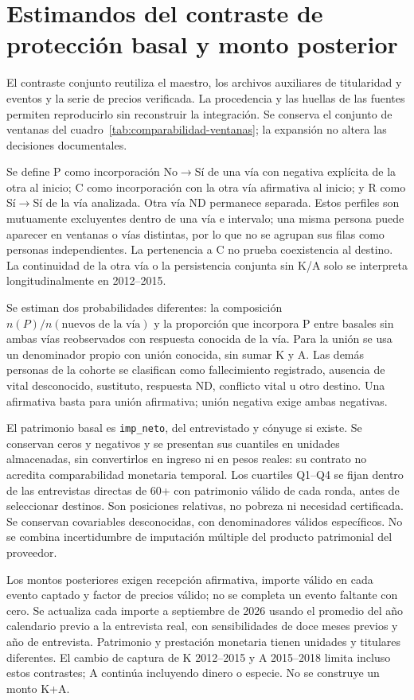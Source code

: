 \section{Estimandos del contraste de protección basal y monto posterior}
\label{sec:metodo-central09}
El contraste conjunto reutiliza el maestro, los archivos auxiliares de
titularidad y eventos y la serie de precios verificada. La procedencia y las
huellas de las fuentes permiten reproducirlo sin reconstruir la integración. Se conserva el conjunto de ventanas del cuadro~\ref{tab:comparabilidad-ventanas}; la expansión no altera las decisiones documentales.

Se define P como incorporación No$\to$Sí de una vía con negativa explícita de la otra al inicio; C como incorporación con la otra vía afirmativa al inicio; y R como Sí$\to$Sí de la vía analizada. Otra vía ND permanece separada. Estos perfiles son mutuamente excluyentes dentro de una vía e intervalo; una misma persona puede aparecer en ventanas o vías distintas, por lo que no se agrupan sus filas como personas independientes. La pertenencia a C no prueba coexistencia al destino. La continuidad de la otra vía o la persistencia conjunta sin K/A solo se interpreta longitudinalmente en 2012--2015.

Se estiman dos probabilidades diferentes: la composición $n(P)/n(\text{nuevos de la vía})$ y la proporción que incorpora P entre basales sin ambas vías reobservados
con respuesta conocida de la vía. Para la unión se usa un denominador propio con unión conocida, sin sumar K y A. Las demás personas de la cohorte se clasifican como fallecimiento registrado, ausencia de vital desconocido, sustituto, respuesta ND, conflicto vital u otro destino. Una afirmativa basta para unión afirmativa; unión negativa exige ambas negativas.

El patrimonio basal es \texttt{imp\_neto}, del entrevistado y cónyuge si existe. Se conservan ceros y negativos y se presentan sus cuantiles en unidades almacenadas, sin convertirlos en ingreso ni en pesos reales: su contrato no acredita comparabilidad monetaria temporal. Los cuartiles Q1--Q4 se fijan dentro de las entrevistas directas de 60+ con patrimonio válido de cada ronda, antes de seleccionar destinos. Son posiciones relativas, no pobreza ni necesidad certificada. Se conservan covariables desconocidas, con denominadores válidos específicos. No se combina incertidumbre de imputación múltiple del producto patrimonial del proveedor.

Los montos posteriores exigen recepción afirmativa, importe válido en cada evento captado y factor de precios válido; no se completa un evento faltante con cero. Se actualiza cada importe a septiembre de 2026 usando el promedio del año calendario previo a la entrevista real, con sensibilidades de doce meses previos y año de entrevista. Patrimonio y prestación monetaria tienen unidades y titulares diferentes. El cambio de captura de K 2012--2015 y A 2015--2018 limita incluso estos contrastes; A continúa incluyendo dinero o especie. No se construye un monto K+A.

